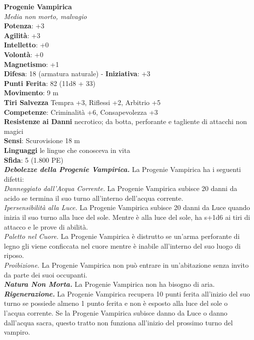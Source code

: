\begin{multicols}{2}
\medskip\textbf{Progenie Vampirica}\\
\emph{Media non morto, malvagio}\\
\textbf{Potenza}: +3\\
\textbf{Agilità}: +3\\
\textbf{Intelletto}: +0\\
\textbf{Volontà}: +0\\
\textbf{Magnetismo}: +1\\
\textbf{Difesa}: 18 (armatura naturale) - \textbf{Iniziativa}: +3\\
\textbf{Punti Ferita}: 82 (11d8 + 33)\\
\textbf{Movimento}: 9 m\\
\textbf{Tiri Salvezza} Tempra +3, Riflessi +2, Arbitrio +5\\
\textbf{Competenze}: Criminalità +6, Consapevolezza +3\\
\textbf{Resistenze ai Danni} necrotico; da botta, perforante e tagliente di attacchi non magici\\
\textbf{Sensi}: Scurovisione 18 m \\
\textbf{Linguaggi} le lingue che conosceva in vita\\
\textbf{Sfida}: 5 (1.800 PE)\smallskip\\
\emph{\textbf{Debolezze della Progenie Vampirica.}} La Progenie Vampirica ha i seguenti difetti:\\
\emph{Danneggiato dall'Acqua Corrente.} La Progenie Vampirica subisce 20 danni da acido se termina il suo turno all'interno dell'acqua corrente.\\
\emph{Ipersensibilità alla Luce.} La Progenie Vampirica subisce 20 danni da Luce quando inizia il suo turno alla luce del sole. Mentre è alla luce del sole, ha s+1d6 ai tiri di attacco e le prove di abilità.\\
\emph{Paletto nel Cuore.} La Progenie Vampirica è distrutto se un'arma perforante di legno gli viene conficcata nel cuore mentre è inabile all'interno del suo luogo di riposo.\\
\emph{Proibizione.} La Progenie Vampirica non può entrare in un'abitazione senza invito da parte dei suoi occupanti.\\
\emph{\textbf{Natura Non Morta.}} La Progenie Vampirica non ha bisogno di aria.\\

\emph{\textbf{Rigenerazione.}} La Progenie Vampirica recupera 10 punti ferita all'inizio del suo turno se possiede almeno 1 punto ferita e non è esposto alla luce del sole o l'acqua corrente. Se la Progenie Vampirica subisce danno da Luce o danno dall'acqua sacra, questo tratto non funziona all'inizio del prossimo turno del vampiro.\\


\end{multicols}
